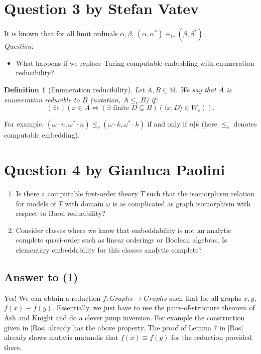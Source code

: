 \documentclass{article}
\newtheorem{definition}{Definition}
\begin{document}
\section*{Question 3 {\small{by Stefan Vatev}}}
It is known that for all limit ordinals $\alpha,\beta$, $(\alpha,\alpha^*)\equiv_{tc} (\beta,\beta^*)$.\\
\textit{Question}:
\begin{itemize}
    \item What happens if we replace Turing computable embedding with enumeration reducibility?
\end{itemize}

\begin{definition}[Enumeration reducibility]
    Let $A,B \subseteq \mathbb{N}$. We say that $A$ is enumeration reducible to $B$ (notation, $A \leq_e B$) if:
    \[(\exists e)(x \in A \iff (\exists \text{ finite } D\subseteq B)(\langle x,D\rangle \in W_e)).\]
\end{definition}
For example, $(\omega\cdot n, \omega^* \cdot n) \leq_c (\omega \cdot k, \omega^* \cdot k) $ if and only if $n | k$ (here $\leq_c$ denotes computable embedding).\\


\section*{Question 4 {\small{by Gianluca Paolini}}}

\begin{enumerate}
    \item Is there a computable first-order theory $T$ such that the isomorphism relation for models of $T$ with domain $\omega$ is as complicated as graph isomorphism with respect to Borel reducibility?
    \item Consider classes where we know that embeddability is not an analytic
        complete quasi-order such as linear orderings or Boolean algebras. Is
        elementary embeddability for this classes analytic complete?
\end{enumerate}

\subsection*{Answer to (1)}
Yes! We can obtain a reduction $f:Graphs \to Graphs$ such that for all graphs
$x,y$, $f(x)\equiv f(y)$. Essentially, we just have to use the
pairs-of-structure theorem of Ash and Knight and do a clever jump inversion. For
example the construction given in [Ros] already has the above property. The
 proof of Lemma 7 in [Ros] already shows mutatis mutandis that $f(x)\equiv f(y)$
 for the reduction provided there.
\end{document}

